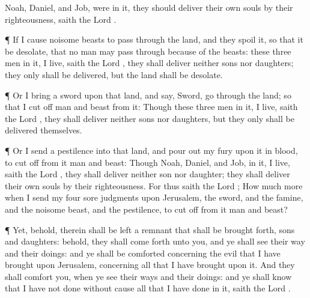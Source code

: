 {Noah,
Daniel, and
Job, were in
it, they should
deliver
{} their own
souls by their
righteousness,
saith the
Lord
{}.
\par }{\PP {}¶
If I cause
noisome
beasts to pass
through the
land, and they
spoil it, so that it be
desolate, that no man may pass
through
because of the
beasts:
 these
three
men
{} in
it,
{} I
live,
saith the
Lord
{}, they shall
deliver neither
sons nor
daughters; they only shall be
delivered, but the
land shall be
desolate.
\par }{\PP {}¶ Or
{} I
bring a
sword upon that
land, and
say,
Sword, go
through the
land; so that I cut
off
man and
beast from it:
Though these
three
men
{} in
it,
{} I
live,
saith the
Lord
{}, they shall
deliver neither
sons nor
daughters, but they only shall be
delivered themselves.
\par }{\PP {}¶ Or
{} I
send a
pestilence into that
land, and pour
out my
fury upon it in
blood, to cut
off from it
man and
beast:
Though
Noah,
Daniel, and
Job,
{} in
it,
{} I
live,
saith the
Lord
{}, they shall
deliver neither
son
nor
daughter; they shall
{}
deliver their own
souls by their
righteousness.
For thus
saith the
Lord
{}; How much more when I
send my
four
sore
judgments upon
Jerusalem, the
sword, and the
famine, and the
noisome
beast, and the
pestilence, to cut
off from it
man and
beast?
\par }{\PP {}¶ Yet, behold, therein shall be
left a
remnant that shall be brought
forth,
{}
sons and
daughters: behold, they shall come
forth unto you, and ye shall
see their
way and their
doings: and ye shall be
comforted concerning the
evil that I have
brought upon
Jerusalem,
{} concerning all that I have
brought upon it.
And they shall
comfort you, when ye
see their
ways and their
doings: and ye shall
know that I have not
done without
cause all that I have
done in it,
saith the
Lord
{}.

}
